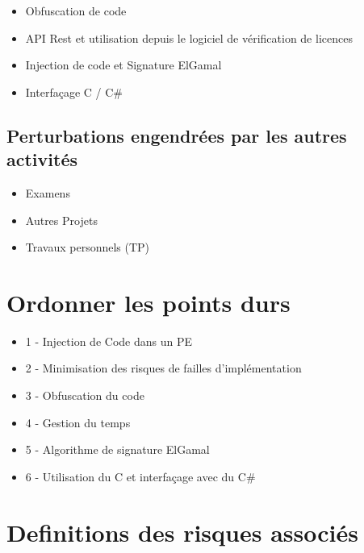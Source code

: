 \begin{itemize}
	\item Obfuscation de code
	\item API Rest et utilisation depuis le logiciel de vérification de licences
	\item Injection de code et Signature ElGamal
	\item Interfaçage C / C\#
\end{itemize}

\section{Perturbations engendrées par les autres activités}
\begin{itemize}
	\item Examens
	\item Autres Projets
	\item Travaux personnels (TP)
\end{itemize}

\chapter{Ordonner les points durs}
\begin{itemize}
	\item 1 - Injection de Code dans un PE
	\item 2 - Minimisation des risques de failles d'implémentation
	\item 3 - Obfuscation du code
	\item 4 - Gestion du temps
	\item 5 - Algorithme de signature ElGamal
	\item 6 - Utilisation du C et interfaçage avec du C\# 
\end{itemize}

\chapter{Definitions des risques associés}

